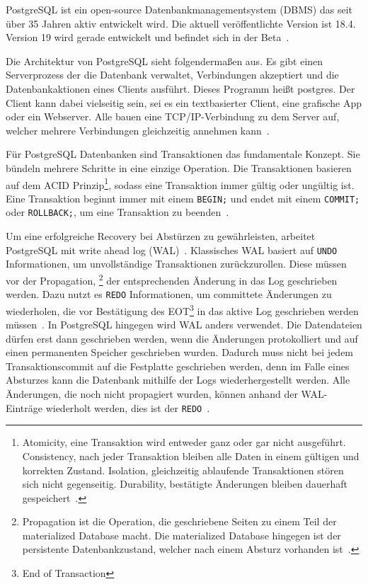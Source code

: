 
PostgreSQL ist ein open-source Datenbankmanagementsystem (DBMS) das seit über 35 Jahren aktiv entwickelt wird.
Die aktuell veröffentlichte Version ist 18.4.
Version 19 wird gerade entwickelt und befindet sich in der Beta~\cite{PostgreSQL}.

Die Architektur von PostgreSQL sieht folgendermaßen aus.
Es gibt einen Serverprozess der die Datenbank verwaltet, Verbindungen akzeptiert und die Datenbankaktionen eines
Clients ausführt.
Dieses Programm heißt postgres.
Der Client kann dabei vielseitig sein, sei es ein textbasierter Client, eine grafische App oder ein Webserver.
Alle bauen eine TCP/IP-Verbindung zu dem Server auf, welcher mehrere Verbindungen gleichzeitig annehmen kann~\cite{PostgreSQLArchitecture}.

Für PostgreSQL Datenbanken sind Transaktionen das fundamentale Konzept.
Sie bündeln mehrere Schritte in eine einzige Operation.
Die Transaktionen basieren auf dem ACID Prinzip\footnote{Atomicity, eine Transaktion wird entweder ganz oder gar nicht ausgeführt.
	Consistency, nach jeder Transaktion bleiben alle Daten in einem gültigen und korrekten Zustand.
	Isolation, gleichzeitig ablaufende Transaktionen stören sich nicht gegenseitig.
	Durability, bestätigte Änderungen bleiben dauerhaft gespeichert~\cite{Haerder1983}.}, sodass eine Transaktion immer
gültig oder ungültig ist.
Eine Transaktion beginnt immer mit einem \texttt{BEGIN;} und endet mit einem \texttt{COMMIT;} oder \texttt{ROLLBACK;},
um eine Transaktion zu beenden~\cite{PostgreSQLTransactions}.

Um eine erfolgreiche Recovery bei Abstürzen zu gewährleisten, arbeitet PostgreSQL mit write ahead log (WAL)~\cite{PostgreSQLWAL}.
Klassisches WAL basiert auf \texttt{UNDO} Informationen, um unvollständige Transaktionen zurückzurollen.
Diese müssen vor der Propagation, \footnote{Propagation ist die Operation,
	die geschriebene Seiten zu einem Teil der materialized Database macht. Die materialized Database hingegen ist der
	persistente Datenbankzustand, welcher nach einem Absturz vorhanden ist~\cite{Haerder1983}.}
der entsprechenden Änderung in das Log geschrieben werden.
Dazu nutzt es \texttt{REDO} Informationen, um committete Änderungen zu wiederholen, die vor Bestätigung des
EOT\footnote{End of Transaction} in das aktive Log geschrieben werden müssen~\cite{Haerder1983}.
In PostgreSQL hingegen wird WAL anders verwendet.
Die Datendateien dürfen erst dann geschrieben werden, wenn die Änderungen protokolliert und auf einen permanenten
Speicher geschrieben wurden.
Dadurch muss nicht bei jedem Transaktionscommit auf die Festplatte geschrieben werden, denn im Falle eines Absturzes
kann die Datenbank mithilfe der Logs wiederhergestellt werden.
Alle Änderungen, die noch nicht propagiert wurden, können anhand der WAL-Einträge wiederholt werden, dies ist
der \texttt{REDO}~\cite{PostgreSQLWAL}.
